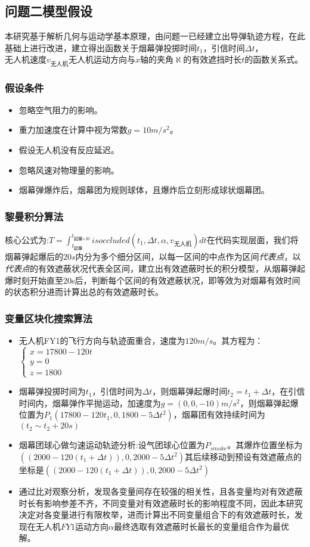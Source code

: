 \documentclass{article}
\begin{document}
\subsection{问题二模型假设}
本研究基于解析几何与运动学基本原理，由问题一已经建立出导弹轨迹方程，在此基础上进行改进，建立得出函数关于烟幕弹投掷时间$t_1$，引信时间$\Delta t$，$无人机速度 v_\text{无人机}$$无人机运动方向与x轴的夹角\aleph$的有效遮挡时长$t$的函数关系式。


\subsubsection{假设条件}
\begin{itemize}
    \item 忽略空气阻力的影响。
    \item 重力加速度在计算中视为常数$g = 10m/s^2$。
    \item 假设无人机没有反应延迟。
    \item 忽略风速对物理量的影响。
    \item 烟幕弹爆炸后，烟幕团为规则球体，且爆炸后立刻形成球状烟幕团。
\end{itemize}
\subsubsection{黎曼积分算法}
核心公式为:$T = \int_{t_\text{起爆}}^{t_\text{起爆+20}}isoccluded(t_1,\Delta t , \alpha , v_\text{无人机})dt$在代码实现层面，我们将烟幕弹起爆后的$20s$内分为多个细分区间，以每一区间的中点作为区间\textit{代表点}，以\textit{代表点}的有效遮蔽状况代表全区间，建立出有效遮蔽时长的积分模型，从烟幕弹起爆时刻开始直至20s后，判断每个区间的有效遮蔽状况，即等效为对烟幕有效时间的状态积分进而计算出总的有效遮蔽时长。
\subsubsection{变量区块化搜索算法}
\begin{itemize}
    \item 无人机FY1的飞行方向与轨迹面重合，速度为$120m/s$。其方程为：$\begin{cases}
        x = 17800 - 120t \\
        y = 0 \\
        z = 1800
    \end{cases}$
    \item 烟幕弹投掷时间为$t_1$，引信时间为$\Delta t$，则烟幕弹起爆时间$t_2 = t_1 + \Delta t$，在引信时间内，烟幕弹作平抛运动，加速度为$g = (0,0,-10)$$m/s^2$，则烟幕弹起爆位置为$P_1(17800 - 120t_1,0,1800 - 5\Delta t^2)$，烟幕团有效持续时间为$(t_2 \sim t_2 + 20s)$
    \item 烟幕团球心做匀速运动轨迹分析:设气团球心位置为$P_{smoke}$。其爆炸位置坐标为$((2000-120(t_1 + \Delta t)),0,2000-5 \Delta t^2)$其后续移动到预设有效遮蔽点的坐标是$((2000-120(t_1 + \Delta t)),0,2000-5 \Delta t^2)$
    \item 通过比对观察分析，发现各变量间存在较强的相关性，且各变量均对有效遮蔽时长有影响参差不齐，不同变量对有效遮蔽时长的影响程度不同，因此本研究决定对各变量进行有限枚举，进而计算出不同变量组合下的有效遮蔽时长，发现在$无人机FY1运动方向\alpha$最终选取有效遮蔽时长最长的变量组合作为最优解。
\end{itemize}
\end{document}
